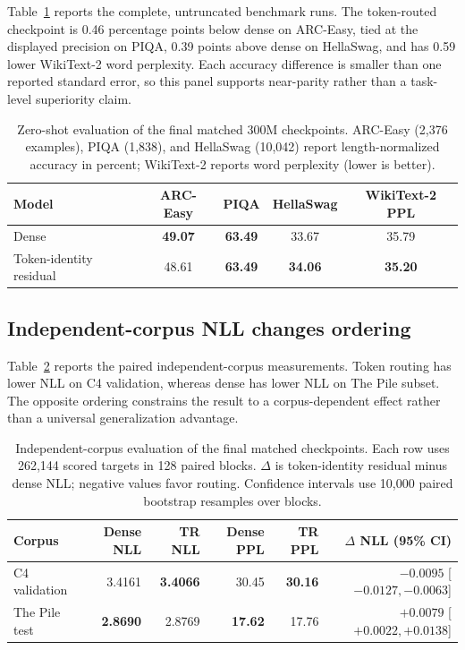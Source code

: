 \documentclass[10pt]{article}
\theoremstyle{definition}
\theoremstyle{remark}
\begin{document}
Table~\ref{tab:benchmark_300m} reports the complete, untruncated benchmark runs. The token-routed checkpoint is 0.46 percentage points below dense on ARC-Easy, tied at the displayed precision on PIQA, 0.39 points above dense on HellaSwag, and has 0.59 lower WikiText-2 word perplexity. Each accuracy difference is smaller than one reported standard error, so this panel supports near-parity rather than a task-level superiority claim.

\begin{table}[!htbp]
\centering
\small
\caption{Zero-shot evaluation of the final matched 300M checkpoints. ARC-Easy (2,376 examples), PIQA (1,838), and HellaSwag (10,042) report length-normalized accuracy in percent; WikiText-2 reports word perplexity (lower is better).}
\label{tab:benchmark_300m}
\begin{tabular}{lcccc}
\toprule
\textbf{Model} & \textbf{ARC-Easy} & \textbf{PIQA} & \textbf{HellaSwag} & \textbf{WikiText-2 PPL} \\
\midrule
Dense & \textbf{49.07} & \textbf{63.49} & 33.67 & 35.79 \\
Token-identity residual & 48.61 & \textbf{63.49} & \textbf{34.06} & \textbf{35.20} \\
\bottomrule
\end{tabular}
\end{table}

\FloatBarrier

\subsection{Independent-corpus NLL changes ordering}
\label{sec:heldout_300m}

Table~\ref{tab:heldout_300m} reports the paired independent-corpus measurements. Token routing has lower NLL on C4 validation, whereas dense has lower NLL on The Pile subset. The opposite ordering constrains the result to a corpus-dependent effect rather than a universal generalization advantage.

\begin{table}[H]
\centering
\small
\setlength{\tabcolsep}{3.5pt}
\caption{Independent-corpus evaluation of the final matched checkpoints. Each row uses 262,144 scored targets in 128 paired blocks. $\Delta$ is token-identity residual minus dense NLL; negative values favor routing. Confidence intervals use 10,000 paired bootstrap resamples over blocks.}
\label{tab:heldout_300m}
\begin{tabular}{lrrrrr}
\toprule
\textbf{Corpus} & \textbf{Dense NLL} & \textbf{TR NLL} & \textbf{Dense PPL} & \textbf{TR PPL} & \textbf{$\Delta$ NLL (95\% CI)} \\
\midrule
C4 validation & 3.4161 & \textbf{3.4066} & 30.45 & \textbf{30.16} & $\mathbf{-0.0095}$ [$-0.0127,-0.0063$] \\
The Pile test & \textbf{2.8690} & 2.8769 & \textbf{17.62} & 17.76 & $+0.0079$ [$+0.0022,+0.0138$] \\
\bottomrule
\end{tabular}
\end{table}
\end{document}
